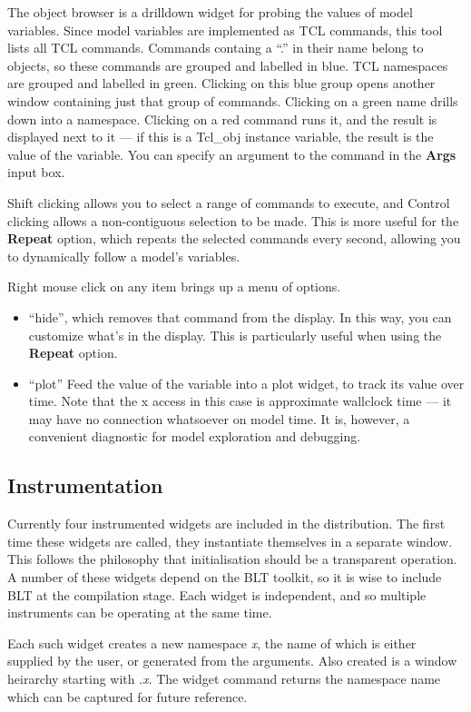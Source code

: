The object browser is a drilldown widget for probing the values of
model variables. Since model variables are implemented as TCL
commands, this tool lists all TCL commands. Commands containg a ``.''
in their name belong to objects, so these commands are grouped and
labelled in blue. TCL namespaces are grouped and labelled in green.
Clicking on this blue group opens another window containing just that
group of commands. Clicking on a green name drills down into a
namespace. Clicking on a red command runs it, and the result is
displayed next to it --- if this is a Tcl\_obj instance variable, the
result is the value of the variable. You can specify an argument to
the command in the {\bf Args} input box.

Shift clicking allows you to select a range of commands to execute, and
Control clicking allows a non-contiguous selection to be made. This is
more useful for the {\bf Repeat} option, which repeats the selected
commands every second, allowing you to dynamically follow a model's variables.

Right mouse click on any item brings up a menu of options. 
\begin{itemize}
\item ``hide'', which removes that command from the
display. In this way, you can customize what's in the display. This is
particularly useful when using the {\bf Repeat} option.
\item ``plot'' Feed the value of the variable into a plot widget, to
  track its value over time. Note that the x access in this case is
  approximate wallclock time --- it may have no connection whatsoever
  on model time. It is, however, a convenient diagnostic for model
  exploration and debugging.
\end{itemize}

\subsection{Instrumentation}

Currently four instrumented widgets are included in the \EcoLab{}
distribution. The first time these widgets are called, they
instantiate themselves in a separate window. This follows the
philosophy that initialisation should be a transparent operation. A
number of these widgets depend on the BLT toolkit, so it is wise to
include BLT at the compilation stage. Each widget is
independent, and so multiple instruments can be operating at the same
time.

\label{widgets namespace}
Each such widget creates a new namespace {\em x}, the name of which is either
supplied by the user, or generated from the arguments. Also created is
a window heirarchy starting with .{\em x}. The widget command returns
the namespace name which can be captured for future reference. 


